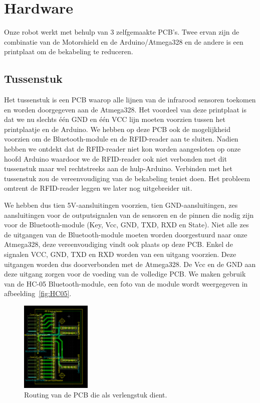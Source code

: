 \chapter{Hardware}
Onze robot werkt met behulp van 3 zelfgemaakte PCB's. Twee ervan zijn de combinatie van de Motorshield en de Arduino/Atmega328 en de andere is een printplaat om de bekabeling te reduceren.





\section{Tussenstuk}
Het tussenstuk is een PCB waarop alle lijnen van de infrarood sensoren toekomen en worden doorgegeven aan de Atmega328. Het voordeel van deze printplaat is dat we nu slechts \'e\'en GND en \'e\'en VCC lijn moeten voorzien tussen het printplaatje en de Arduino. We hebben op deze PCB ook de mogelijkheid voorzien om de Bluetooth-module en de RFID-reader aan te sluiten. Nadien hebben we ontdekt dat de RFID-reader niet kon worden aangesloten op onze hoofd Arduino waardoor we de RFID-reader ook niet verbonden met dit tussenstuk maar wel rechtstreeks aan de hulp-Arduino. Verbinden met het tussenstuk zou de vereenvoudiging van de bekabeling teniet doen. Het probleem omtrent de RFID-reader leggen we later nog uitgebreider uit. 






We hebben dus tien 5V-aansluitingen voorzien, tien GND-aansluitingen, zes aansluitingen voor de outputsignalen van de sensoren en de pinnen die nodig zijn voor de Bluetooth-module (Key, Vcc, GND, TXD, RXD en State). Niet alle zes de uitgangen van de Bluetooth-module moeten worden doorgestuurd naar onze Atmega328, deze vereenvoudiging vindt ook plaats op deze PCB. Enkel de signalen VCC, GND, TXD en RXD worden van een uitgang voorzien. Deze uitgangen worden dus doorverbonden met de Atmega328. De Vcc en de GND aan deze uitgang zorgen voor de voeding van de volledige PCB. We maken gebruik van de HC-05 Bluetooth-module, een foto van de module wordt weergegeven in afbeelding~\ref{fig:HC05}.
\newpage
\begin{figure}[h]
\centering
\includegraphics[width=0.3\textwidth]{tussenstukPCB.png}
\caption{Routing van de PCB die als verlengstuk dient. \label{tussenstukPCB}}
\end{figure}


